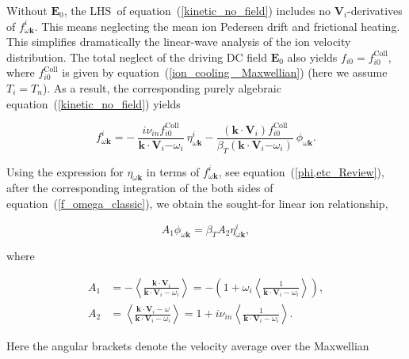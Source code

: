 \documentclass[draft]{agujournal2019}
\renewcommand{\vec}{\mathbf}
\begin{document}
{Without $\vec{E}_{0}$, the LHS\ of equation~(\ref{kinetic_no_field})
includes no $\vec{V}_{i}$-derivatives of $f_{\omega\vec{k}}^{i}$. This
means neglecting the mean ion Pedersen drift and frictional heating.
This simplifies dramatically the linear-wave analysis of the ion
velocity distribution. The total neglect of the driving DC field $\vec{E}_{0}$
also yields $f_{i0}=f_{i0}^{\mathrm{Coll}}$, where $f_{i0}^{\mathrm{Coll}}$ is
given by equation~(\ref{ion_cooling _Maxwellian}) (here we assume $T_{i}=T_{n}$). As a
result, the corresponding purely algebraic equation~(\ref{kinetic_no_field})
yields
\begin{linenomath*}
\begin{equation}
f_{\omega\vec{k}}^{i}=-\ \frac{i\nu_{in}f_{i0}^{\mathrm{Coll}}}{\vec{k}%
\cdot\vec{V}_{i}\mathbf{-}\omega_{i}}\ \eta_{\omega\vec{k}}^{i}-\frac{(\vec{k}%
\cdot\vec{V}_{i})f_{i0}^{\mathrm{Coll}}}{\beta_{T}(\vec{k}\cdot\vec{V}%
_{i}\mathbf{-}\omega_{i})}\ \phi_{\omega\vec{k}}. 
\label{f_omega_classic}
\end{equation}
\end{linenomath*}
Using the expression for $\eta_{\omega\vec{k}}$ in terms of $f_{\omega\vec{k}%
}^{i}$, see equation~(\ref{phi,etc_Review}), after the corresponding
integration of the both sides of equation~(\ref{f_omega_classic}), we obtain
the sought-for linear ion relationship,
\begin{linenomath*}
\begin{equation}
A_{1}\phi_{\omega\vec{k}}=\beta_{T}A_{2}\eta_{\omega\vec{k}}^{i},
\label{A_1,2_relation}
\end{equation}
\end{linenomath*}
where
\begin{linenomath*}
\begin{subequations}
\label{A_1,A_2}%
\begin{align}
A_{1}  &  =-\left\langle \frac{\vec{k}\cdot\vec{V}_{i}}{\vec{k}\cdot\vec
{V}_{i}-\omega_{i}}\right\rangle =-\left(  1+\omega_{i}\left\langle \frac{1}%
{\vec{k}\cdot\vec{V}_{i}-\omega_{i}}\right\rangle \right)  ,\label{A_1}\\
A_{2}  &  =\left\langle \frac{\vec{k}\cdot\vec{V}_{i}-\omega}{\vec{k}\cdot
\vec{V}_{i}-\omega_{i}}\right\rangle =1+i\nu_{in}\left\langle \frac{1}{\vec
{k}\cdot\vec{V}_{i}-\omega_{i}}\right\rangle. 
\label{A_2}
\end{align}
\end{subequations}
\end{linenomath*}
Here the angular brackets denote the velocity average over the Maxwellian
}
\end{document}
